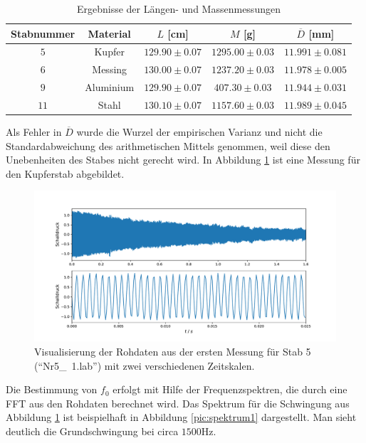 \documentclass[a4paper, 12pt]{scrartcl}
\begin{document}
\begin{table}[H]
\centering
\begin{tabular}{c|c|c|c|c}
Stabnummer & Material & $L$ [cm] & $M$ [g] & $\overline{D}$ [mm] \\
\hline
$5$ & Kupfer & $129.90\pm 0.07$ & $1295.00\pm 0.03$ & $11.991 \pm 0.081$ \\
$6$ & Messing & $130.00 \pm 0.07$ & $1237.20 \pm 0.03$ & $11.978 \pm 0.005$ \\
$9$ & Aluminium & $129.90 \pm 0.07$ & $407.30 \pm 0.03$ & $11.944 \pm 0.031$ \\
$11$ & Stahl & $130.10 \pm 0.07$ & $1157.60 \pm 0.03$ & $11.989 \pm 0.045$
\end{tabular}
\caption{Ergebnisse der Längen- und Massenmessungen}
\end{table}
Als Fehler in $\overline{D}$ wurde die Wurzel der empirischen Varianz und nicht die Standardabweichung des arithmetischen Mittels genommen, weil diese den Unebenheiten des Stabes nicht gerecht wird. In Abbildung \ref{pic:rohdaten} ist eine Messung für den Kupferstab abgebildet.

\begin{figure}[h]
	\centering
	\includegraphics[width=\linewidth]{plots/rohdaten.pdf}
	\caption{Visualisierung der Rohdaten aus der ersten Messung für Stab 5 (\mbox{``Nr5\_ 1.lab''}) mit zwei verschiedenen Zeitskalen.}
	\label{pic:rohdaten}
\end{figure}

Die Bestimmung von $f_0$ erfolgt mit Hilfe der Frequenzspektren, die durch eine FFT aus den Rohdaten berechnet wird. Das Spektrum für die Schwingung aus Abbildung \ref{pic:rohdaten} ist beispielhaft in Abbildung \ref{pic:spektrum1} dargestellt. Man sieht deutlich die Grundschwingung bei circa $1500$Hz.
\end{document}
